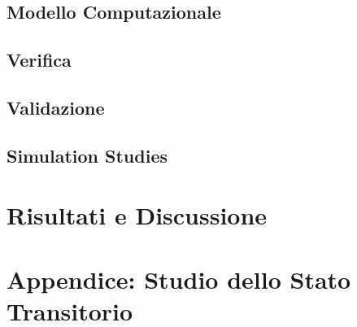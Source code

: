 \documentclass[acmtog]{acmart}
\begin{document}
\subsection{Modello Computazionale}


\subsection{Verifica}


\subsection{Validazione}


\subsection{Simulation Studies}


\section{Risultati e Discussione}





\appendix

\section{Appendice: Studio dello Stato Transitorio}

\end{document}
